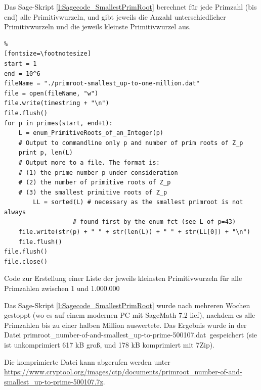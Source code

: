 \begin{refsegment}
Das Sage-Skript \ref{l:Sagecode_SmallestPrimRoot} berechnet für jede Primzahl (bis \glqq end\grqq)
alle Primitivwurzeln, und gibt jeweils die Anzahl unterschiedlicher
Primitivwurzeln und die jeweils kleinste Primitivwurzel aus.

\begin{sagecode}
\begin{Verbatim}%
[fontsize=\footnotesize]
start = 1
end = 10^6
fileName = "./primroot-smallest_up-to-one-million.dat"
file = open(fileName, "w")
file.write(timestring + "\n")
file.flush()
for p in primes(start, end+1):
	L = enum_PrimitiveRoots_of_an_Integer(p)
	# Output to commandline only p and number of prim roots of Z_p
	print p, len(L)
	# Output more to a file. The format is:
	# (1) the prime number p under consideration
	# (2) the number of primitive roots of Z_p
	# (3) the smallest primitive roots of Z_p
        LL = sorted(L) # necessary as the smallest primroot is not always
	               # found first by the enum fct (see L of p=43)
	file.write(str(p) + " " + str(len(L)) + " " + str(LL[0]) + "\n")
	file.flush()
file.flush()
file.close()
\end{Verbatim}
\caption{Code zur Erstellung einer Liste der jeweils kleinsten Primitivwurzeln für
	alle Primzahlen zwischen 1 und 1.000.000}
\label{l:Sagecode_SmallestPrimRoot}{}
\end{sagecode}

Das Sage-Skript \ref{l:Sagecode_SmallestPrimRoot} wurde nach mehreren Wochen
gestoppt (wo es auf einem modernen PC mit SageMath 7.2 lief), nachdem es alle
Primzahlen bis zu einer halben Million auswertete. Das Ergebnis wurde in der
Datei \glqq primroot\_number-of-and-smallest\_up-to-prime-500107.dat\grqq~gespeichert
(sie ist unkomprimiert 617 kB groß, und 178 kB komprimiert mit 7Zip).

Die komprimierte Datei kann abgerufen werden unter
\url{https://www.cryptool.org/images/ctp/documents/primroot_number-of-and-smallest_up-to-prime-500107.7z}.


\end{refsegment}

